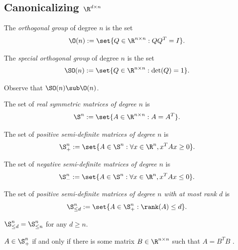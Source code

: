 \subsection{Canonicalizing $\R^{d \times n}$}\label{sec:canonicalizing-matrices}
\begin{definition}
    The \emph{orthogonal group} of degree $n$ is the set
    \[
        \O(n) := \set{Q \in \R^{n \times n} : Q Q^T = I}.
    \]
\end{definition}

\begin{definition}
    The \emph{special orthogonal group} of degree $n$ is the set
    \[
        \SO(n) := \set{Q \in \R^{n \times n} : \det(Q) = 1}.
    \]
\end{definition}

\begin{remark}
    Observe that $\SO(n) \sub \O(n)$.
\end{remark}

\begin{definition}
    The set of \emph{real symmetric matrices of degree $n$} is
    \[
        \S^n := \set{A \in \R^{n \times n} : A = A^T}.
    \]
\end{definition}

\begin{definition}
    The set of \emph{positive semi-definite matrices of degree $n$} is
    \[
        \S^n_+ := \set{A \in \S^n : \forall x \in \R^n, x^T A x \geq 0}.
    \]
\end{definition}

\begin{definition}
    The set of \emph{negative semi-definite matrices of degree $n$} is
    \[
        \S^n_- := \set{A \in \S^n : \forall x \in \R^n, x^T A x \leq 0}.
    \]
\end{definition}

\begin{definition}
    The set of \emph{positive semi-definite matrices of degree $n$ with at most rank $d$} is
    \[
        \S^n_{\leq d} := \set{A \in \S^n_+ : \rank(A) \leq d}.
    \]
\end{definition}

\begin{remark}
    $\S^n_{\leq d} = \S^n_{\leq n}$ for any $d \geq n$.
\end{remark}

\begin{proposition}
    $A \in \S^n_+$ if and only if there is some matrix $B \in \R^{n \times n}$ such that $A = B^T B$ \cite{wikipedia:definite-matrices}.
\end{proposition}

